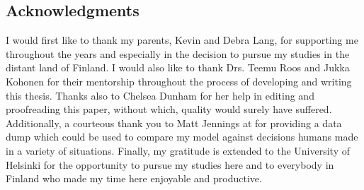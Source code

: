 \vspace*{\fill}
\begin{centering}

\section*{Acknowledgments}
\label{sec:thanks}

\end{centering}


I would first like to thank my parents, Kevin and Debra Lang,
for supporting me
throughout the years and especially in the decision to pursue my studies
in the distant land of Finland.
%
I would also
like to thank Drs. Teemu Roos
and Jukka Kohonen
for %
their mentorship throughout the
process of developing and writing this thesis.
%
Thanks also to Chelsea Dunham for her help in editing and proofreading
this paper,
without which,
quality would surely have suffered.
%
Additionally,
a courteous thank you to Matt Jennings at
 for providing a data dump
which could be used to compare my model against decisions humans made
in a variety of situations.
%
Finally, my gratitude is extended to the University of Helsinki for the
opportunity to pursue my studies here
and to everybody in Finland who made my time here enjoyable and productive.


\vspace*{\fill}
\newpage
